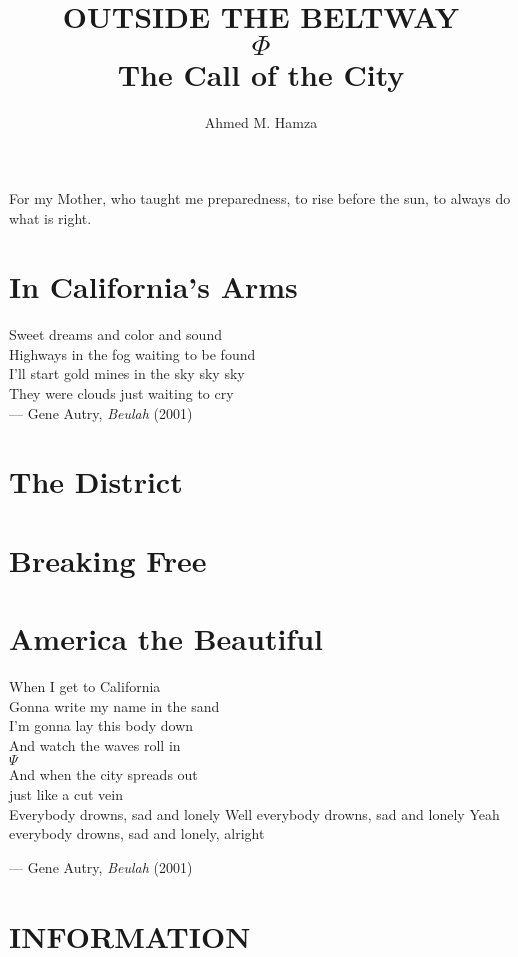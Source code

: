 \documentclass[b5paper]{book}
\begin{document}
\author{Ahmed M. Hamza}
\title{OUTSIDE THE BELTWAY\\$\Phi$\\The Call of the City}

\maketitle

\vspace*{\fill} 
\begin{center}
For my Mother, who taught me preparedness, to rise before the sun, to always do what is right. 
\end{center}
\vspace*{\fill} 




\tableofcontents
\part{In California's Arms}
\vspace*{\fill} 
\begin{center}
Sweet dreams and color and sound\\
Highways in the fog waiting to be found \\
I'll start gold mines in the sky sky sky \\
They were clouds just waiting to cry \\

--- Gene Autry, \textit{Beulah} (2001)
\end{center}
\vspace*{\fill}

\part{The District}
\part{Breaking Free}
\part{America the Beautiful}
\vspace*{\fill} 
\begin{center}
When I get to California\\
Gonna write my name in the sand\\
I'm gonna lay this body down\\
And watch the waves roll in\\
$\Psi$\\
And when the city spreads out\\
just like a cut vein\\
Everybody drowns, sad and lonely
Well everybody drowns, sad and lonely
Yeah everybody drowns, sad and lonely, alright

--- Gene Autry, \textit{Beulah} (2001)
\end{center}
\vspace*{\fill}
\part{INFORMATION}
\end{document}

